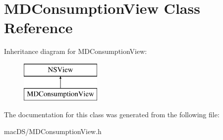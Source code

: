 \hypertarget{interface_m_d_consumption_view}{\section{M\-D\-Consumption\-View Class Reference}
\label{interface_m_d_consumption_view}
}
Inheritance diagram for M\-D\-Consumption\-View\-:\begin{figure}[H]
\begin{center}
\leavevmode
\includegraphics[height=2.000000cm]{interface_m_d_consumption_view}
\end{center}
\end{figure}


The documentation for this class was generated from the following file\-:\begin{DoxyCompactItemize}
\item 
mac\-D\-S/M\-D\-Consumption\-View.\-h\end{DoxyCompactItemize}
